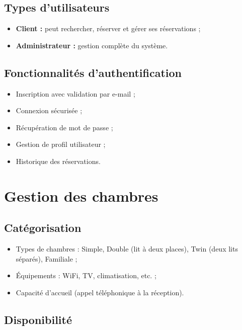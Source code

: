 \documentclass[12pt,a4paper]{report}
\begin{document}
\subsection{Types d'utilisateurs}

\begin{itemize}
  \item \textbf{Client :} peut rechercher, réserver et gérer ses réservations ;
  \item \textbf{Administrateur :} gestion complète du système.
\end{itemize}

\subsection{Fonctionnalités d'authentification}

\begin{itemize}
  \item Inscription avec validation par e-mail ;
  \item Connexion sécurisée ;
  \item Récupération de mot de passe ;
  \item Gestion de profil utilisateur ;
  \item Historique des réservations.
\end{itemize}

\section{Gestion des chambres}

\subsection{Catégorisation}

\begin{itemize}
  \item Types de chambres : Simple, Double (lit à deux places), Twin (deux lits séparés), Familiale ;
  \item Équipements : WiFi, TV, climatisation, etc. ;
  \item Capacité d'accueil (appel téléphonique à la réception).
\end{itemize}

\subsection{Disponibilité}
\end{document}
